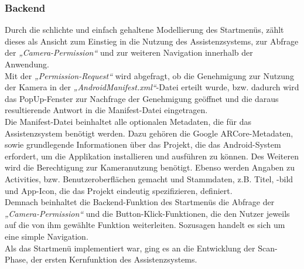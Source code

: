 \subsubsection{Backend}
Durch die schlichte und einfach gehaltene Modellierung des Startmenüs, zählt dieses als Ansicht zum Einstieg in die Nutzung des Assistenzsystems, zur Abfrage der 
\textit{„Camera-Permission“} und zur weiteren Navigation innerhalb der Anwendung.
\\ 
Mit der \textit{„Permission-Request“} wird abgefragt, ob die Genehmigung zur Nutzung der Kamera in der \textit{„AndroidManifest.xml“}-Datei erteilt wurde, bzw. 
dadurch wird das PopUp-Fenster zur Nachfrage der Genehmigung geöffnet und die daraus resultierende Antwort in die Manifest-Datei eingetragen. 
\\ 
\linebreak
Die Manifest-Datei beinhaltet alle optionalen Metadaten, die für das Assistenzsystem benötigt werden. Dazu gehören die Google ARCore-Metadaten, sowie 
grundlegende Informationen über das Projekt, die das Android-System erfordert, um die Applikation installieren und ausführen zu können. Des Weiteren wird 
die Berechtigung zur Kameranutzung benötigt. Ebenso werden Angaben zu Activities, bzw. Benutzeroberflächen gemacht und Stammdaten, z.B. Titel, -bild und 
App-Icon, die das Projekt eindeutig spezifizieren, definiert.
\\ 
\linebreak
Demnach beinhaltet die Backend-Funktion des Startmenüs die Abfrage der \textit{„Camera-Permission“} und die Button-Klick-Funktionen, die den Nutzer 
jeweils auf die von ihm gewählte Funktion weiterleiten. Sozusagen handelt es sich um eine simple Navigation.
\\ 
\linebreak
Als das Startmenü implementiert war, ging es an die Entwicklung der Scan-Phase, der ersten Kernfunktion des Assistenzsystems.

